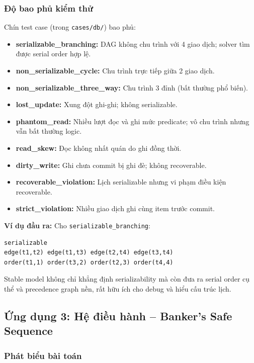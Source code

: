 \documentclass[a4paper,11pt]{article}
\begin{document}
\subsubsection*{Độ bao phủ kiểm thử}

Chín test case (trong \texttt{cases/db/}) bao phủ:
\begin{itemize}
  \item \textbf{serializable\_branching:} DAG không chu trình với 4 giao dịch; solver tìm được serial order hợp lệ.
  \item \textbf{non\_serializable\_cycle:} Chu trình trực tiếp giữa 2 giao dịch.
  \item \textbf{non\_serializable\_three\_way:} Chu trình 3 đỉnh (bất thường phổ biến).
  \item \textbf{lost\_update:} Xung đột ghi-ghi; không serializable.
  \item \textbf{phantom\_read:} Nhiều lượt đọc và ghi mức predicate; vô chu trình nhưng vẫn bất thường logic.
  \item \textbf{read\_skew:} Đọc không nhất quán do ghi đồng thời.
  \item \textbf{dirty\_write:} Ghi chưa commit bị ghi đè; không recoverable.
  \item \textbf{recoverable\_violation:} Lịch serializable nhưng vi phạm điều kiện recoverable.
  \item \textbf{strict\_violation:} Nhiều giao dịch ghi cùng item trước commit.
\end{itemize}

\textbf{Ví dụ đầu ra:} Cho \texttt{serializable\_branching}:
\begin{lstlisting}
serializable
edge(t1,t2) edge(t1,t3) edge(t2,t4) edge(t3,t4)
order(t1,1) order(t3,2) order(t2,3) order(t4,4)
\end{lstlisting}

Stable model không chỉ khẳng định serializability mà còn đưa ra serial order cụ thể
và precedence graph nền, rất hữu ích cho debug và hiểu cấu trúc lịch.

\subsection{Ứng dụng 3: Hệ điều hành -- Banker's Safe Sequence}\label{subsec:os}

\subsubsection*{Phát biểu bài toán}
\end{document}
